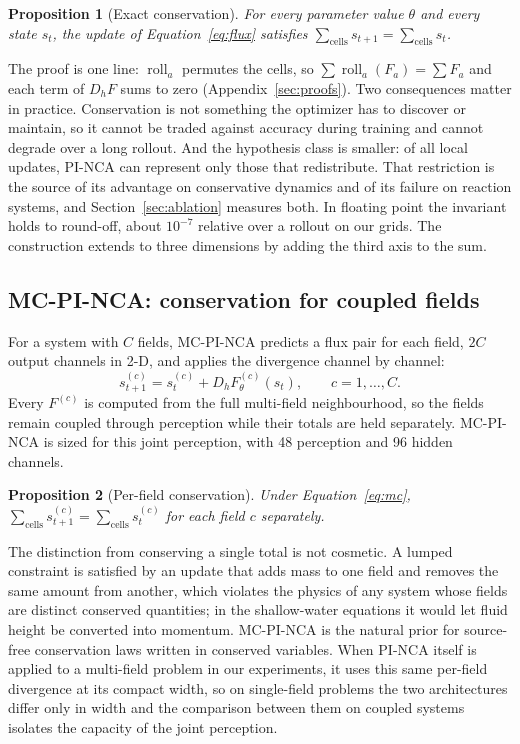 \documentclass{article}
\newtheorem{proposition}{Proposition}
\begin{document}
\begin{proposition}[Exact conservation]
\label{prop:conservation}
For every parameter value $\theta$ and every state $s_t$, the update of
Equation~\ref{eq:flux} satisfies $\sum_{\mathrm{cells}}s_{t+1}=\sum_{\mathrm{cells}}s_t$.
\end{proposition}
The proof is one line: $\operatorname{roll}_a$ permutes the cells, so
$\sum\operatorname{roll}_a(F_a)=\sum F_a$ and each term of $D_hF$ sums to zero
(Appendix~\ref{sec:proofs}). Two consequences matter in practice. Conservation is not
something the optimizer has to discover or maintain, so it cannot be traded against
accuracy during training and cannot degrade over a long rollout. And the hypothesis class
is smaller: of all local updates, PI-NCA can represent only those that redistribute. That
restriction is the source of its advantage on conservative dynamics and of its failure on
reaction systems, and Section~\ref{sec:ablation} measures both. In floating point the
invariant holds to round-off, about $10^{-7}$ relative over a rollout on our grids. The
construction extends to three dimensions by adding the third axis to the sum.



\subsection{MC-PI-NCA: conservation for coupled fields}
For a system with $C$ fields, MC-PI-NCA predicts a flux pair for each field, $2C$ output
channels in 2-D, and applies the divergence channel by channel:
\begin{equation}
 s_{t+1}^{(c)}=s_t^{(c)}+D_hF^{(c)}_\theta(s_t),\qquad c=1,\dots,C.
\label{eq:mc}
\end{equation}
Every $F^{(c)}$ is computed from the full multi-field neighbourhood, so the fields remain
coupled through perception while their totals are held separately. MC-PI-NCA is sized for
this joint perception, with 48 perception and 96 hidden channels.

\begin{proposition}[Per-field conservation]
\label{prop:perfield}
Under Equation~\ref{eq:mc}, $\sum_{\mathrm{cells}}s^{(c)}_{t+1}=\sum_{\mathrm{cells}}
s^{(c)}_t$ for each field $c$ separately.
\end{proposition}
The distinction from conserving a single total is not cosmetic. A lumped constraint is
satisfied by an update that adds mass to one field and removes the same amount from
another, which violates the physics of any system whose fields are distinct conserved
quantities; in the shallow-water equations it would let fluid height be converted into
momentum. MC-PI-NCA is the natural prior for source-free conservation laws written in
conserved variables. When PI-NCA itself is applied to a multi-field problem in our
experiments, it uses this same per-field divergence at its compact width, so on
single-field problems the two architectures differ only in width and the comparison
between them on coupled systems isolates the capacity of the joint perception.
\end{document}
